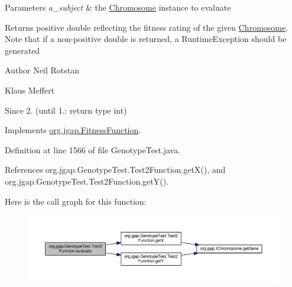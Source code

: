 \begin{DoxyParams}{Parameters}
{\em a\-\_\-subject} & the \hyperlink{classorg_1_1jgap_1_1_chromosome}{Chromosome} instance to evaluate\\
\hline
\end{DoxyParams}
\begin{DoxyReturn}{Returns}
positive double reflecting the fitness rating of the given \hyperlink{classorg_1_1jgap_1_1_chromosome}{Chromosome}. Note that if a non-\/positive double is returned, a Runtime\-Exception should be generated
\end{DoxyReturn}
\begin{DoxyAuthor}{Author}
Neil Rotstan 

Klaus Meffert 
\end{DoxyAuthor}
\begin{DoxySince}{Since}
2. (until 1.\-: return type int) 
\end{DoxySince}


Implements \hyperlink{classorg_1_1jgap_1_1_fitness_function_a0078e42480eac93729f906ac4dc185d9}{org.\-jgap.\-Fitness\-Function}.



Definition at line 1566 of file Genotype\-Test.\-java.



References org.\-jgap.\-Genotype\-Test.\-Test2\-Function.\-get\-X(), and org.\-jgap.\-Genotype\-Test.\-Test2\-Function.\-get\-Y().



Here is the call graph for this function\-:
\nopagebreak
\begin{figure}[H]
\begin{center}
\leavevmode
\includegraphics[width=350pt]{classorg_1_1jgap_1_1_genotype_test_1_1_test2_function_ac741afc698abf042df1f9944c4de9b64_cgraph}
\end{center}
\end{figure}


